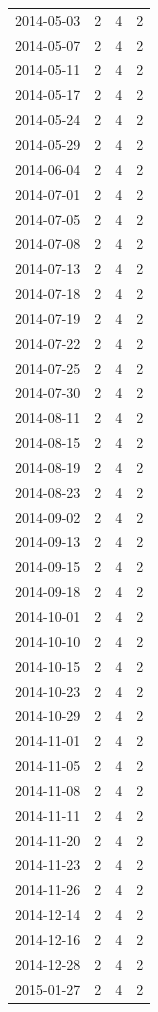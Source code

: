 \begin{tabular}{lrrr}
2014-05-03 & 2 & 4 & 2 \\
2014-05-07 & 2 & 4 & 2 \\
2014-05-11 & 2 & 4 & 2 \\
2014-05-17 & 2 & 4 & 2 \\
2014-05-24 & 2 & 4 & 2 \\
2014-05-29 & 2 & 4 & 2 \\
2014-06-04 & 2 & 4 & 2 \\
2014-07-01 & 2 & 4 & 2 \\
2014-07-05 & 2 & 4 & 2 \\
2014-07-08 & 2 & 4 & 2 \\
2014-07-13 & 2 & 4 & 2 \\
2014-07-18 & 2 & 4 & 2 \\
2014-07-19 & 2 & 4 & 2 \\
2014-07-22 & 2 & 4 & 2 \\
2014-07-25 & 2 & 4 & 2 \\
2014-07-30 & 2 & 4 & 2 \\
2014-08-11 & 2 & 4 & 2 \\
2014-08-15 & 2 & 4 & 2 \\
2014-08-19 & 2 & 4 & 2 \\
2014-08-23 & 2 & 4 & 2 \\
2014-09-02 & 2 & 4 & 2 \\
2014-09-13 & 2 & 4 & 2 \\
2014-09-15 & 2 & 4 & 2 \\
2014-09-18 & 2 & 4 & 2 \\
2014-10-01 & 2 & 4 & 2 \\
2014-10-10 & 2 & 4 & 2 \\
2014-10-15 & 2 & 4 & 2 \\
2014-10-23 & 2 & 4 & 2 \\
2014-10-29 & 2 & 4 & 2 \\
2014-11-01 & 2 & 4 & 2 \\
2014-11-05 & 2 & 4 & 2 \\
2014-11-08 & 2 & 4 & 2 \\
2014-11-11 & 2 & 4 & 2 \\
2014-11-20 & 2 & 4 & 2 \\
2014-11-23 & 2 & 4 & 2 \\
2014-11-26 & 2 & 4 & 2 \\
2014-12-14 & 2 & 4 & 2 \\
2014-12-16 & 2 & 4 & 2 \\
2014-12-28 & 2 & 4 & 2 \\
2015-01-27 & 2 & 4 & 2 \\

\end{tabular}
